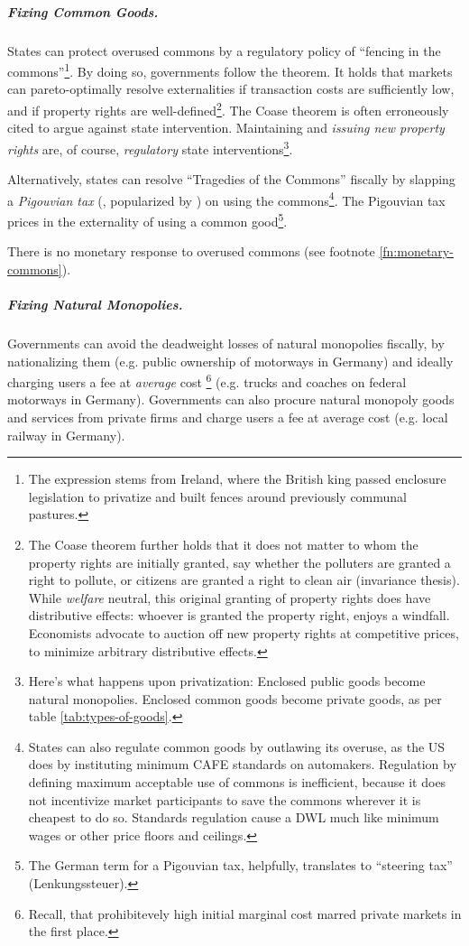 \subparagraph{Fixing Common Goods.}  \label{sec:common-goodresponse} States can protect overused commons by a regulatory policy of ``fencing in the commons''\footnote{
	The expression stems from Ireland, where the British king passed enclosure legislation to privatize and built fences around previously communal pastures.}. 
By doing so, governments follow the \cite{Coase1960} theorem. It holds that markets can pareto-optimally resolve externalities if transaction costs are sufficiently low, and if property rights are well-defined\footnote{
	The Coase theorem further holds that it does not matter to whom the property rights are initially granted, say whether the polluters are granted a right to pollute, or citizens are granted a right to clean air (invariance thesis). While \emph{welfare} neutral, this original granting of property rights does have distributive effects: whoever is granted the property right, enjoys a windfall. Economists advocate to auction off new property rights at competitive prices, to minimize arbitrary distributive effects.}.%
The Coase theorem is often erroneously cited to argue against state intervention. Maintaining and \emph{issuing new property rights} are, of course, \emph{regulatory} state interventions\footnote{
	Here's what happens upon privatization: Enclosed public goods become natural monopolies. Enclosed common goods become private goods, as per table \ref{tab:types-of-goods}.}.

Alternatively, states can resolve ``Tragedies of the Commons'' \citep{Hardin-1968-aa} fiscally by slapping a \emph{Pigouvian tax} (\citealt{Pigou1912}, popularized by \citealt{Baumol1972}) on using the commons\footnote{
	States can also regulate common goods by outlawing its overuse, as the US does by instituting minimum \gls{CAFE} standards on automakers. Regulation by defining maximum acceptable use of commons is inefficient, because it does not incentivize market participants to save the commons wherever it is cheapest to do so. Standards regulation cause a \gls{DWL} much like minimum wages or other price floors and ceilings.}. 
The Pigouvian tax prices in the externality of using a common good\footnote{
	The German term for a Pigouvian tax, helpfully, translates to ``steering tax'' (Lenkungssteuer).}. 

There is no monetary response to overused commons (see footnote \ref{fn:monetary-commons}).

\subparagraph{Fixing Natural Monopolies.}  \label{sec:natural-monopoly-response} Governments can avoid the deadweight losses of natural monopolies fiscally, by nationalizing them (e.g. public ownership of motorways in Germany) and ideally charging users a fee at \emph{average} cost
\footnote{
\label{fn:why-ac-fees}
	Recall, that prohibitevely high initial marginal cost marred private markets in the first place.
} 
(e.g. trucks and coaches on federal motorways in Germany). Governments can also procure natural monopoly goods and services from private firms and charge users a fee at average cost (e.g. local railway in Germany).
		
